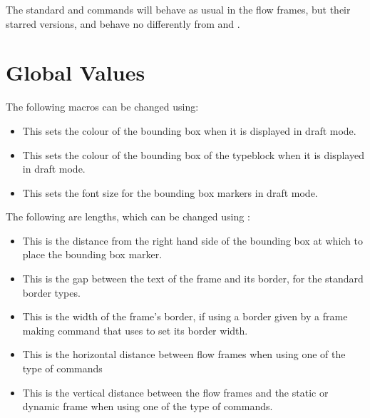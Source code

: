 \documentclass{article}
\begin{document}
The standard  and  commands will
behave as usual in the flow frames, but their starred versions,
 and  behave no differently
from  and .

\section*{Global Values}

The following macros can be changed using\linebreak {}:

\begin{itemize}
\item {}

This sets the colour of the bounding box
when it is displayed in draft mode.

\item
{}

This sets the colour of
the bounding box of the typeblock when it is displayed
in draft mode.

\item {}

This sets the font size for the bounding box markers in
draft mode.

\end{itemize}

The following are lengths, which can be changed using
:

\begin{itemize}
\item {}

This is the distance from the right hand side of the
bounding box at which to place the bounding box marker.

\item {}

This is the gap between the text of the frame and
its border, for the standard border types.

\item {}

This is the width of the frame's border, if using
a border given by a frame making command that uses 
to set its border width.

\item {}

This is the horizontal distance between flow frames when using one of the
 type of commands

\item {}

This is the vertical distance between the flow frames and the static or
dynamic frame when using one of the  type of commands.
\end{itemize}

\label{lastpage}
\end{document}
